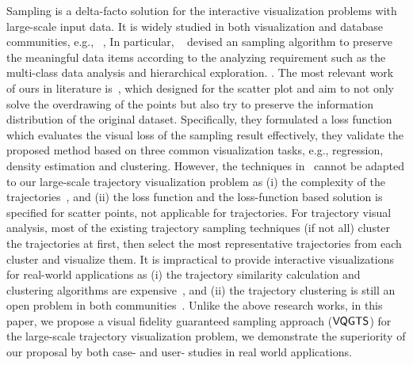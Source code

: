 Sampling is a delta-facto solution for the interactive visualization problems with large-scale input data.
It is widely studied in both visualization and database communities, e.g., ~\cite{battle2013dynamic,chen2014visual,park2016visualization}, 
In particular, ~\cite{chen2014visual} devised an sampling algorithm to preserve the meaningful data items according to the analyzing requirement such as the multi-class data analysis and hierarchical exploration. 
.
The most relevant work of ours in literature is~\cite{park2016visualization}, which designed for the scatter plot and aim to not only solve the overdrawing of the points but also try to preserve the information distribution of the original dataset.
Specifically, they formulated a loss function which evaluates the visual loss of the sampling result effectively,
they validate the proposed method based on three common visualization tasks, e.g., regression, density estimation and clustering.
However, the techniques in~\cite{park2016visualization} cannot be adapted to our large-scale trajectory visualization problem
as (i) the complexity of the trajectories~\cite{pelekis2010unsupervised}, and (ii) the loss function and the loss-function based solution is specified for scatter points, not applicable for trajectories.
For trajectory visual analysis,  most of the existing trajectory sampling techniques (if not all) cluster the trajectories at first, 
then select the most representative trajectories from each cluster and visualize them.
It is impractical to provide interactive visualizations for real-world applications as 
(i) the trajectory similarity calculation and clustering algorithms are expensive~\cite{pelekis2007similarity},
and (ii) the trajectory clustering is still an open problem in both communities~\cite{panagiotakis2011segmentation,agarwal2018subtrajectory}.
Unlike the above research works, in this paper, we propose a visual fidelity guaranteed sampling approach ($\mathsf{VQGTS}{}$) for the large-scale trajectory visualization problem,
we demonstrate the superiority of our proposal by both case- and user- studies in real world applications.






